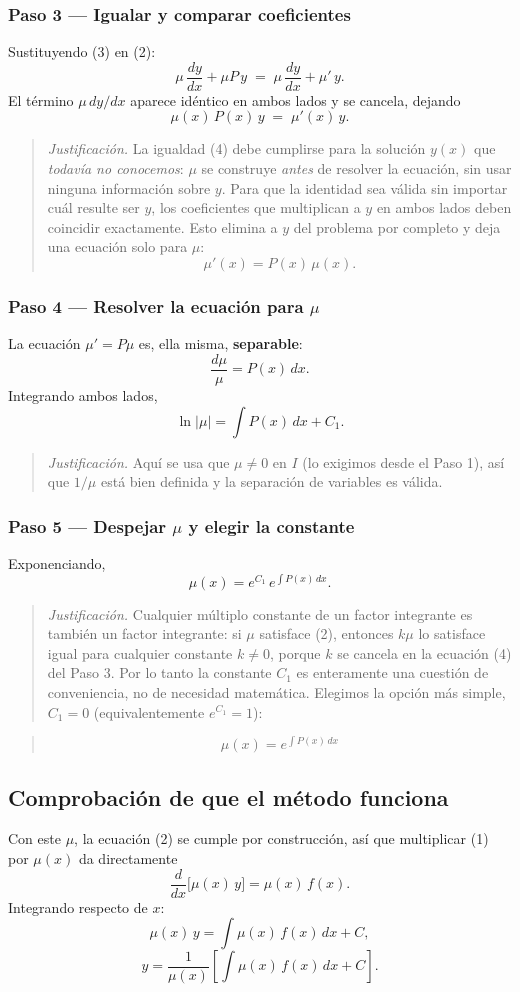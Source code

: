 \documentclass[12pt,letterpaper]{article}
\newcommand{\justif}[1]{%
  \par\noindent
  {\small\color{JustifColor}%
  \begin{quote}
  \textit{Justificación.} #1
  \end{quote}}%
}
\newenvironment{resultado}
  {\begin{quote}\color{ResultColor}\bfseries}
  {\end{quote}}
\newcommand{\paso}[1]{\subsubsection*{#1}}
\begin{document}
\paso{Paso 3 --- Igualar y comparar coeficientes}

Sustituyendo (3) en (2):
\[
\mu\,\frac{dy}{dx} + \mu P\, y \;=\; \mu\,\frac{dy}{dx} + \mu'\, y.
\]
El término $\mu\, dy/dx$ aparece idéntico en ambos lados y se cancela, dejando
\begin{equation}
\mu(x)\,P(x)\,y \;=\; \mu'(x)\,y. \tag{4}
\end{equation}

\justif{La igualdad (4) debe cumplirse para la solución $y(x)$ que
\emph{todavía no conocemos}: $\mu$ se construye \emph{antes} de resolver la
ecuación, sin usar ninguna información sobre $y$. Para que la identidad sea
válida sin importar cuál resulte ser $y$, los coeficientes que multiplican a
$y$ en ambos lados deben coincidir exactamente. Esto elimina a $y$ del
problema por completo y deja una ecuación solo para $\mu$:
\[
\mu'(x) = P(x)\,\mu(x).
\]}

\paso{Paso 4 --- Resolver la ecuación para $\mu$}

La ecuación $\mu' = P\mu$ es, ella misma, \textbf{separable}:
\[
\frac{d\mu}{\mu} = P(x)\,dx.
\]
Integrando ambos lados,
\[
\ln|\mu| = \int P(x)\,dx + C_1.
\]

\justif{Aquí se usa que $\mu \neq 0$ en $I$ (lo exigimos desde el Paso 1),
así que $1/\mu$ está bien definida y la separación de variables es válida.}

\paso{Paso 5 --- Despejar $\mu$ y elegir la constante}

Exponenciando,
\[
\mu(x) = e^{C_1}\, e^{\int P(x)\,dx}.
\]

\justif{Cualquier múltiplo constante de un factor integrante es también un
factor integrante: si $\mu$ satisface (2), entonces $k\mu$ lo satisface
igual para cualquier constante $k \neq 0$, porque $k$ se cancela en la
ecuación (4) del Paso 3. Por lo tanto la constante $C_1$ es enteramente una
cuestión de conveniencia, no de necesidad matemática. Elegimos la opción más
simple, $C_1 = 0$ (equivalentemente $e^{C_1}=1$):}

\begin{resultado}
\[
\mu(x) = e^{\int P(x)\,dx}
\]
\end{resultado}

\subsection*{Comprobación de que el método funciona}

Con este $\mu$, la ecuación (2) se cumple por construcción, así que
multiplicar (1) por $\mu(x)$ da directamente
\[
\frac{d}{dx}\Big[\mu(x)\,y\Big] = \mu(x)\,f(x).
\]
Integrando respecto de $x$:
\[
\mu(x)\,y = \int \mu(x)\,f(x)\,dx + C,
\]
\begin{equation}
y = \frac{1}{\mu(x)}\left[\int \mu(x)\,f(x)\,dx + C\right]. \tag{5}
\end{equation}
\end{document}
